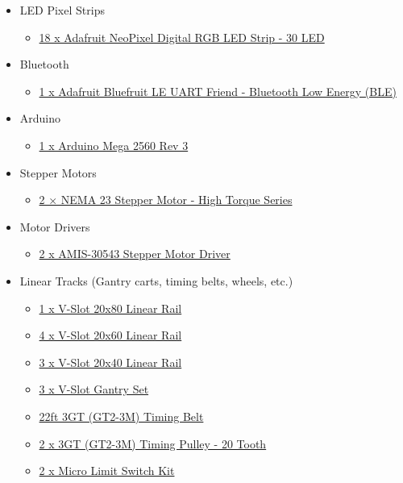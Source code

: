 \documentclass[11pt]{IEEEtran}
\begin{document}
\begin{itemize}
\item LED Pixel Strips
  \begin{itemize}
  \item \href{https://www.adafruit.com/product/1376?length=2}{18 x Adafruit NeoPixel Digital RGB LED Strip - 30 LED}
  \end{itemize}

\item Bluetooth 
  \begin{itemize}
  \item \href{https://www.adafruit.com/product/2479}{1 x Adafruit Bluefruit LE UART Friend - Bluetooth Low Energy (BLE)}
  \end{itemize}

\item Arduino 
  \begin{itemize}
  \item \href{https://store.arduino.cc/usa/arduino-mega-2560-rev3}{1 x Arduino Mega 2560 Rev 3}
  \end{itemize}

\item Stepper Motors
  \begin{itemize}
  \item \href{https://openbuildspartstore.com/nema-23-stepper-motor-high-torque-series/}{2 × NEMA 23 Stepper Motor - High Torque Series}
  \end{itemize}

\item Motor Drivers
  \begin{itemize}
  \item \href{https://www.pololu.com/product/2970}{2 x AMIS-30543 Stepper Motor Driver}
  \end{itemize}

\item Linear Tracks (Gantry carts, timing belts, wheels, etc.)
  \begin{itemize}
  \item \href{https://openbuildspartstore.com/v-slot-20x80-linear-rail/}{1 x V-Slot 20x80 Linear Rail}
  \item \href{https://openbuildspartstore.com/v-slot-20x60-linear-rail/}{4 x V-Slot 20x60 Linear Rail}
  \item \href{https://openbuildspartstore.com/v-slot-20x40-linear-rail/}{3 x V-Slot 20x40 Linear Rail}
  \item \href{https://openbuildspartstore.com/v-slot-gantry-set-universal/}{3 x V-Slot Gantry Set}
  \item \href{https://openbuildspartstore.com/3gt-gt2-3m-timing-belt-by-the-foot/}{22ft 3GT (GT2-3M) Timing Belt}
  \item \href{https://openbuildspartstore.com/3gt-timing-pulley-20-tooth/}{2 x 3GT (GT2-3M) Timing Pulley - 20 Tooth}
  \item \href{https://openbuildspartstore.com/micro-limit-switch-kit/}{2 x Micro Limit Switch Kit}
  \end{itemize}


\end{itemize}
\end{document}

